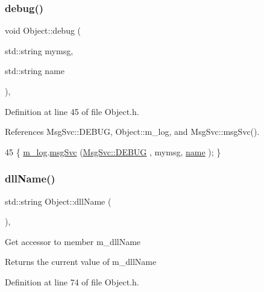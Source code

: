 \subsubsection{\texorpdfstring{debug()}{debug()}\hspace{0.1cm}{\footnotesize\ttfamily [2/2]}}
{\footnotesize\ttfamily void Object\+::debug (\begin{DoxyParamCaption}\item[{std\+::string}]{mymsg,  }\item[{std\+::string}]{name }\end{DoxyParamCaption})\hspace{0.3cm}{\ttfamily [inline]}, {\ttfamily [inherited]}}



Definition at line 45 of file Object.\+h.



References Msg\+Svc\+::\+D\+E\+B\+UG, Object\+::m\+\_\+log, and Msg\+Svc\+::msg\+Svc().


\begin{DoxyCode}
45 \{ \hyperlink{classObject_a0d269813dd7ac1f24bc143031e2963f2}{m\_log}.\hyperlink{classMsgSvc_ad25f18047920cc59a314e5098259711c}{msgSvc} (\hyperlink{classMsgSvc_ae671eb7301996cd049d2da8a65925926a1dbdcc82dce88370ec335883c83b38b0}{MsgSvc::DEBUG}   , mymsg, \hyperlink{classObject_a300f4c05dd468c7bb8b3c968868443c1}{name} ); \}
\end{DoxyCode}
\mbox{\label{classObject_a2e3947f2870094c332d7454117f3ec63}} 
\subsubsection{\texorpdfstring{dll\+Name()}{dllName()}}
{\footnotesize\ttfamily std\+::string Object\+::dll\+Name (\begin{DoxyParamCaption}{ }\end{DoxyParamCaption})\hspace{0.3cm}{\ttfamily [inline]}, {\ttfamily [inherited]}}

Get accessor to member m\+\_\+dll\+Name \begin{DoxyReturn}{Returns}
the current value of m\+\_\+dll\+Name 
\end{DoxyReturn}


Definition at line 74 of file Object.\+h.



